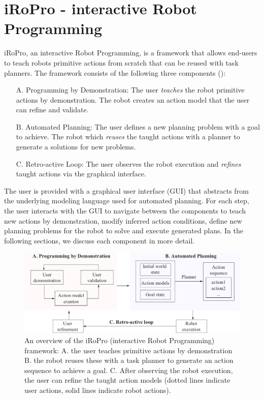\section{iRoPro - interactive Robot Programming}
iRoPro, an interactive Robot Programming, is a framework that allows end-users to teach robots primitive actions from scratch that can be reused with task planners.
The framework consists of the following three components (): 
\begin{enumerate}
	\item[A.]{Programming by Demonstration: The user \textit{teaches} the robot primitive actions by demonstration. The robot creates an action model that the user can refine and validate.}
	\item[B.]{Automated Planning: The user defines a new planning problem with a goal to achieve. The robot which \textit{reuses} the taught actions with a planner to generate a solutions for new problems.}
	\item[C.]{Retro-active Loop: The user observes the robot execution and \textit{refines} taught actions via the graphical interface.}
\end{enumerate}
The user is provided with a graphical user interface (GUI) that abstracts from the underlying modeling language used for automated planning.
For each step, the user interacts with the GUI to navigate between the components to teach new actions by demonstration, modify inferred action conditions, define new planning problems for the robot to solve and execute generated plans.
In the following sections, we discuss each component in more detail. 

\begin{figure}[!h]
	\centering
	\includegraphics[width=\linewidth]{figures/framework.png}
	\caption{An overview of the iRoPro (interactive Robot Programming) framework: A. the user teaches primitive actions by demonstration B. the robot reuses these with a task planner to generate an action sequence to achieve a goal.
	C. After observing the robot execution, the user can refine the taught action models (dotted lines indicate user actions, solid lines indicate robot actions).}
	\label{fig:framework}
\end{figure}


